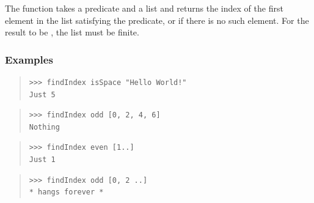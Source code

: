 \begin{haddockdesc}
\item[\begin{tabular}{@{}l}
findIndex :: (a -> Bool) -> {\char 91}a{\char 93} -> Maybe Int
\end{tabular}]
{\haddockbegindoc
The  function takes a predicate and a list and returns
 the index of the first element in the list satisfying the predicate,
 or  if there is no such element.
 For the result to be , the list must be finite.\par
\subsubsection*{\textbf{Examples}}
\begin{quote}
{\haddockverb\begin{verbatim}
>>> findIndex isSpace "Hello World!"
Just 5

\end{verbatim}}
\end{quote}
\begin{quote}
{\haddockverb\begin{verbatim}
>>> findIndex odd [0, 2, 4, 6]
Nothing

\end{verbatim}}
\end{quote}
\begin{quote}
{\haddockverb\begin{verbatim}
>>> findIndex even [1..]
Just 1

\end{verbatim}}
\end{quote}
\begin{quote}
{\haddockverb\begin{verbatim}
>>> findIndex odd [0, 2 ..]
* hangs forever *

\end{verbatim}}
\end{quote}}
\end{haddockdesc}
